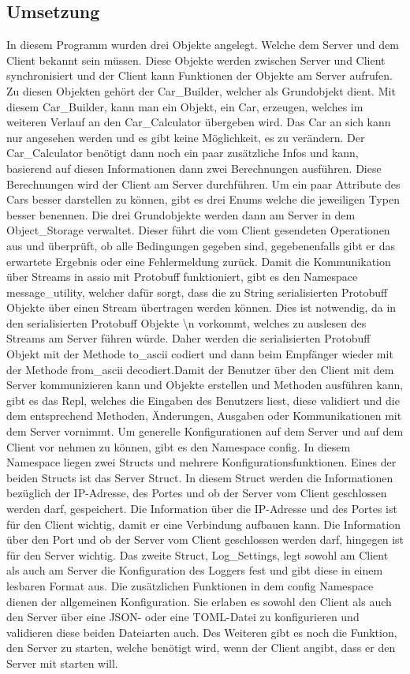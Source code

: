 \subsection{Umsetzung}
In diesem Programm wurden drei Objekte angelegt. Welche dem Server und dem Client bekannt sein müssen. Diese Objekte werden zwischen Server und Client synchronisiert und der Client kann Funktionen der Objekte am Server aufrufen. Zu diesen Objekten gehört der Car\_Builder, welcher als Grundobjekt dient. Mit diesem Car\_Builder, kann man ein Objekt, ein Car, erzeugen, welches im weiteren Verlauf an den Car\_Calculator übergeben wird. Das Car an sich kann nur angesehen werden und es gibt keine Möglichkeit, es zu verändern. Der Car\_Calculator benötigt dann noch ein paar zusätzliche Infos und kann, basierend auf diesen Informationen dann zwei Berechnungen ausführen. Diese Berechnungen wird der Client am Server durchführen. Um ein paar Attribute des Cars besser darstellen zu können, gibt es drei Enums welche die jeweiligen Typen besser benennen. Die drei Grundobjekte werden dann am Server in dem Object\_Storage verwaltet. Dieser führt die vom Client gesendeten Operationen aus und überprüft, ob alle Bedingungen gegeben sind, gegebenenfalls gibt er das erwartete Ergebnis oder eine Fehlermeldung zurück. Damit die Kommunikation über Streams in assio mit Protobuff funktioniert, gibt es den Namespace message\_utility, welcher dafür sorgt, dass die zu String serialisierten Protobuff Objekte über einen Stream übertragen werden können. Dies ist notwendig, da in den serialisierten Protobuff Objekte \textbackslash n vorkommt, welches zu auslesen des Streams am Server führen würde. Daher werden die serialisierten Protobuff Objekt mit der Methode to\_ascii codiert und dann beim Empfänger wieder mit der Methode from\_ascii decodiert.Damit der Benutzer über den Client mit dem Server kommunizieren kann und Objekte erstellen und Methoden ausführen kann, gibt es das Repl, welches die Eingaben des Benutzers liest, diese validiert und die dem entsprechend Methoden, Änderungen, Ausgaben oder Kommunikationen mit dem Server vornimmt. Um generelle Konfigurationen auf dem Server und auf dem Client vor nehmen zu können, gibt es den Namespace config. In diesem Namespace liegen zwei Structs und mehrere Konfigurationsfunktionen. Eines der beiden Structs ist das Server Struct. In diesem Struct werden die Informationen bezüglich der IP-Adresse, des Portes und ob der Server vom Client geschlossen werden darf, gespeichert. Die Information über die IP-Adresse und des Portes ist für den Client wichtig, damit er eine Verbindung aufbauen kann. Die Information über den Port und ob der Server vom Client geschlossen werden darf, hingegen ist für den Server wichtig. Das zweite Struct, Log\_Settings, legt sowohl am Client als auch am Server die Konfiguration des Loggers fest und gibt diese in einem lesbaren Format aus. Die zusätzlichen Funktionen in dem config Namespace dienen der allgemeinen Konfiguration. Sie erlaben es sowohl den Client als auch den Server über eine JSON- oder eine TOML-Datei zu konfigurieren und validieren diese beiden Dateiarten auch. Des Weiteren gibt es noch die Funktion, den Server zu starten, welche benötigt wird, wenn der Client angibt, dass er den Server mit starten will.
